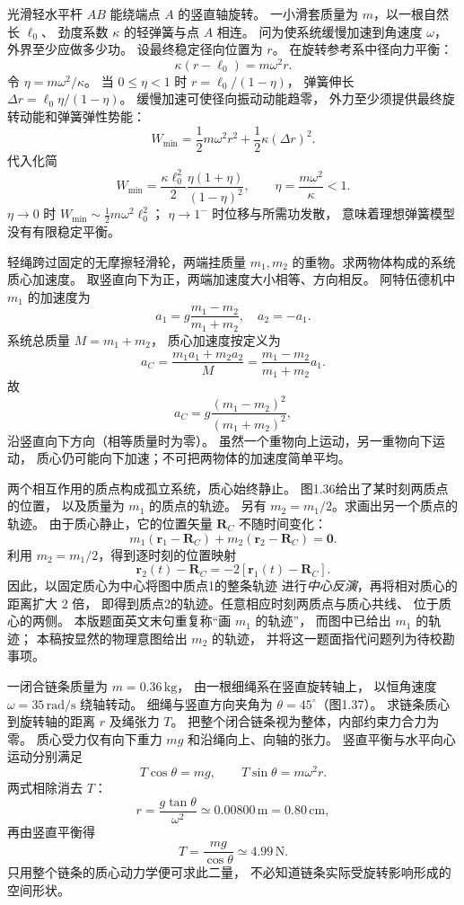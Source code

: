 光滑轻水平杆 $AB$ 能绕端点 $A$ 的竖直轴旋转。
一小滑套质量为 $m$，以一根自然长 $\ell_0$、
劲度系数 $\kappa$ 的轻弹簧与点 $A$ 相连。
问为使系统缓慢加速到角速度 $\omega$，
外界至少应做多少功。
\exsolution
设最终稳定径向位置为 $r$。
在旋转参考系中径向力平衡：
\[
\kappa(r-\ell_0)=m\omega^2 r.
\]
令 $\eta=m\omega^2/\kappa$。
当 $0\le\eta<1$ 时
$r=\ell_0/(1-\eta)$，
弹簧伸长
$\Delta r=\ell_0\eta/(1-\eta)$。
缓慢加速可使径向振动动能趋零，
外力至少须提供最终旋转动能和弹簧弹性势能：
\[
W_{\min}
=\frac12m\omega^2r^2
+\frac12\kappa(\Delta r)^2.
\]
代入化简
\[
\boxed{W_{\min}=
\frac{\kappa\ell_0^2}{2}
\frac{\eta(1+\eta)}{(1-\eta)^2}},
\qquad
\eta=\frac{m\omega^2}{\kappa}<1.
\]
\excheck $\eta\to0$ 时
$W_{\min}\sim \tfrac12m\omega^2\ell_0^2$；
$\eta\to1^-$ 时位移与所需功发散，
意味着理想弹簧模型没有有限稳定平衡。

轻绳跨过固定的无摩擦轻滑轮，两端挂质量
$m_1,m_2$ 的重物。求两物体构成的系统质心加速度。
\exsolution
取竖直向下为正，两端加速度大小相等、方向相反。
阿特伍德机中 $m_1$ 的加速度为
\[
a_1=g\frac{m_1-m_2}{m_1+m_2},
\quad a_2=-a_1.
\]
系统总质量 $M=m_1+m_2$，
质心加速度按定义为
\[
a_C=\frac{m_1a_1+m_2a_2}{M}
=\frac{m_1-m_2}{m_1+m_2}a_1.
\]
故
\[
\boxed{a_C=g\frac{(m_1-m_2)^2}{(m_1+m_2)^2}},
\]
沿竖直向下方向（相等质量时为零）。
\excheck 虽然一个重物向上运动，另一重物向下运动，
质心仍可能向下加速；不可把两物体的加速度简单平均。

两个相互作用的质点构成孤立系统，质心始终静止。
图1.36给出了某时刻两质点的位置，
以及质量为 $m_1$ 的质点的轨迹。
另有 $m_2=m_1/2$。求画出另一个质点的轨迹。
\exsolution
由于质心静止，它的位置矢量 $\bm R_C$ 不随时间变化：
\[
m_1(\bm r_1-\bm R_C)+
m_2(\bm r_2-\bm R_C)=\bm0.
\]
利用 $m_2=m_1/2$，得到逐时刻的位置映射
\[
\boxed{\bm r_2(t)-\bm R_C
=-2[\bm r_1(t)-\bm R_C]}.
\]
因此，以固定质心为中心将图中质点1的整条轨迹
进行\emph{中心反演}，再将相对质心的距离扩大 $2$ 倍，
即得到质点2的轨迹。任意相应时刻两质点与质心共线、
位于质心的两侧。
\excheck 本版题面英文末句重复称“画 $m_1$ 的轨迹”，
而图中已给出 $m_1$ 的轨迹；
本稿按显然的物理意图给出 $m_2$ 的轨迹，
并将这一题面指代问题列为待校勘事项。

一闭合链条质量为 $m=0.36\,\mathrm{kg}$，
由一根细绳系在竖直旋转轴上，
以恒角速度 $\omega=35\,\mathrm{rad/s}$ 绕轴转动。
细绳与竖直方向夹角为 $\theta=45^\circ$（图1.37）。
求链条质心到旋转轴的距离 $r$ 及绳张力 $T$。
\exsolution
把整个闭合链条视为整体，内部约束力合力为零。
质心受力仅有向下重力 $mg$ 和沿绳向上、向轴的张力。
竖直平衡与水平向心运动分别满足
\[
T\cos\theta=mg,\qquad
T\sin\theta=m\omega^2r.
\]
两式相除消去 $T$：
\[
\boxed{r=\frac{g\tan\theta}{\omega^2}
\simeq0.00800\,\mathrm m=0.80\,\mathrm{cm}},
\]
再由竖直平衡得
\[
\boxed{T=\frac{mg}{\cos\theta}
\simeq4.99\,\mathrm N}.
\]
\excheck 只用整个链条的质心动力学便可求此二量，
不必知道链条实际受旋转影响形成的空间形状。

